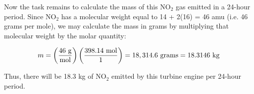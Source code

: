\vskip 10pt

Now the task remains to calculate the mass of this NO$_{2}$ gas emitted in a 24-hour period.  Since NO$_{2}$ has a molecular weight equal to 14 + 2(16) = 46 amu (i.e. 46 grams per mole), we may calculate the mass in grams by multiplying that molecular weight by the molar quantity:

\vskip 10pt

$$m = \left(46 \hbox{ g} \over \hbox{mol} \right) \left({398.14 \hbox{ mol} \over 1} \right) = 18,314.6 \hbox{ grams} = 18.3146 \hbox{ kg}$$

Thus, there will be 18.3 kg of NO$_{2}$ emitted by this turbine engine per 24-hour period.




